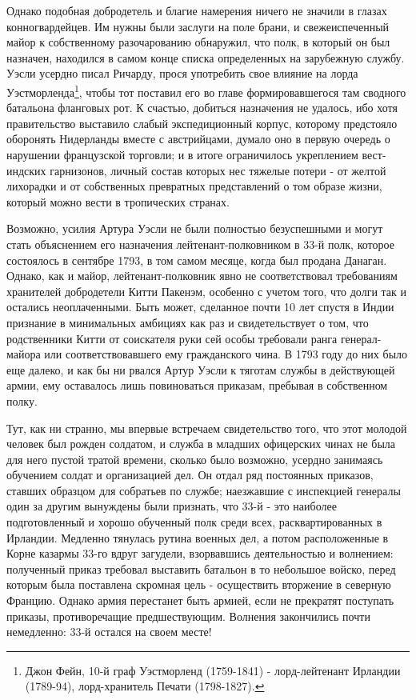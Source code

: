 \documentclass[
  oneside,
  12pt,
  titlepage]{book}
\begin{document}
Однако подобная добродетель и благие намерения ничего не значили в глазах конногвардейцев. Им нужны были заслуги на поле брани, и свежеиспеченный майор к собственному разочарованию обнаружил, что полк, в который он был назначен, находился в самом конце списка определенных на зарубежную службу. Уэсли усердно писал Ричарду, прося употребить свое влияние на лорда Уэстморленда\footnote{Джон Фейн, 10-й граф Уэстморленд (1759-1841) - лорд-лейтенант Ирландии (1789-94), лорд-хранитель Печати (1798-1827).}, чтобы тот поставил его во главе формировавшегося там сводного батальона фланговых рот. К счастью, добиться назначения не удалось, ибо хотя правительство выставило слабый экспедиционный корпус, которому предстояло оборонять Нидерланды вместе с австрийцами, думало оно в первую очередь о нарушении французской торговли; и в итоге ограничилось укреплением вест-индских гарнизонов, личный состав которых нес тяжелые потери - от желтой лихорадки и от собственных превратных представлений о том образе жизни, который можно вести в тропических странах.

Возможно, усилия Артура Уэсли не были полностью безуспешными и могут стать объяснением его назначения лейтенант-полковником в 33-й полк, которое состоялось в сентябре 1793, в том самом месяце, когда был продана Данаган. Однако, как и майор, лейтенант-полковник явно не соответствовал требованиям хранителей добродетели Китти Пакенэм, особенно с учетом того, что долги так и остались неоплаченными. Быть может, сделанное почти 10 лет спустя в Индии признание в минимальных амбициях как раз и свидетельствует о том, что родственники Китти от соискателя руки сей особы требовали ранга генерал-майора или соответствовавшего ему гражданского чина. В 1793 году до них было еще далеко, и как бы ни рвался Артур Уэсли к тяготам службы в действующей армии, ему оставалось лишь повиноваться приказам, пребывая в собственном полку.

Тут, как ни странно, мы впервые встречаем свидетельство того, что этот молодой человек был рожден солдатом, и служба в младших офицерских чинах не была для него пустой тратой времени, сколько было возможно, усердно занимаясь обучением солдат и организацией дел. Он отдал ряд постоянных приказов, ставших образцом для собратьев по службе; наезжавшие с инспекцией генералы один за другим вынуждены были признать, что 33-й - это наиболее подготовленный и хорошо обученный полк среди всех, расквартированных в Ирландии. Медленно тянулась рутина военных дел, а потом расположенные в Корне казармы 33-го вдруг загудели, взорвавшись деятельностью и волнением: полученный приказ требовал выставить батальон в то небольшое войско, перед которым была поставлена скромная цель - осуществить вторжение в северную Францию. Однако армия перестанет быть армией, если не прекратят поступать приказы, противоречащие предшествующим. Волнения закончились почти немедленно: 33-й остался на своем месте!
\end{document}
